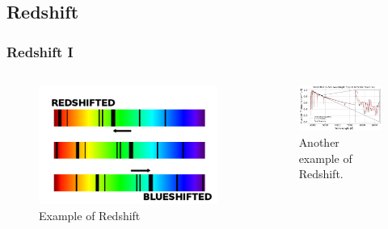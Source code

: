 \documentclass[aspectratio=169]{beamer}
\begin{document}
\subsection{Redshift}
\begin{frame}
\frametitle{Redshift I}
  \begin{block}

    \begin{columns}[t]
        \begin{figure}
	\vspace{-1cm} 
            \centering
            \includegraphics[scale = .32]{red2.png} %
            \caption{Example of Redshift \cite{redshift}}
            \label{fig:red}
        \end{figure}

        \begin{figure}
 
	\vspace{-0.5cm}
	\hspace*{-.5cm} 
            \centering
            \includegraphics[width = 2.9in]{redshift.png} %
            \caption{Another example of Redshift.}
            \label{fig:redshift}
        \end{figure}

    \end{columns}
  \end{block}
\end{frame}
\end{document}
